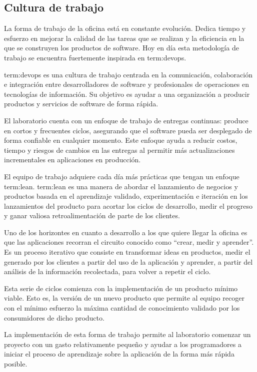 \subsection{Cultura de trabajo}
\label{cultura_de_trabajo}

La forma de trabajo de la oficina está en constante evolución. Dedica tiempo y
esfuerzo en mejorar la calidad de las tareas que se realizan y la eficiencia en
la que se construyen los productos de software. Hoy en día esta metodología de
trabajo se encuentra fuertemente inspirada en \gls{term:devops}.

\gls{term:devops} es una cultura de trabajo centrada en la comunicación,
colaboración e integración entre desarrolladores de software y profesionales de
operaciones en tecnologías de información. Su objetivo es ayudar a una
organización a producir productos y servicios de software de forma rápida.

El laboratorio cuenta con un enfoque de trabajo de entregas continuas: produce
en cortos y frecuentes ciclos, asegurando que el software pueda ser desplegado
de forma confiable en cualquier momento. Este enfoque ayuda a reducir costos,
tiempo y riesgos de cambios en las entregas al permitir más actualizaciones
incrementales en aplicaciones en producción.

El equipo de trabajo adquiere cada día más prácticas que tengan un enfoque
\gls{term:lean}. \gls{term:lean} es una manera de abordar el lanzamiento de
negocios y productos basada en el aprendizaje validado, experimentación e
iteración en los lanzamientos del producto para acortar los ciclos de
desarrollo, medir el progreso y ganar valiosa retroalimentación de parte de los
clientes.

Uno de los horizontes en cuanto a desarrollo a los que quiere llegar la oficina
es que las aplicaciones recorran el circuito  conocido como
“crear, medir y aprender”. Es un proceso iterativo que consiste en transformar
ideas en productos, medir el  generado por los clientes a partir
del uso de la aplicación y aprender, a partir del análisis de la información
recolectada, para volver a repetir el ciclo.

Esta serie de ciclos comienza con la implementación de un producto mínimo
viable. Esto es, la versión de un nuevo producto que permite al equipo recoger
con el mínimo esfuerzo la máxima cantidad de conocimiento validado por los
consumidores de dicho producto.

La implementación de esta forma de trabajo permite al laboratorio comenzar un
proyecto con un gasto relativamente pequeño y ayudar a los programadores a
iniciar el proceso de aprendizaje sobre la aplicación de la forma más rápida
posible\cite[p~.2]{lean:the_lean_startup}.

